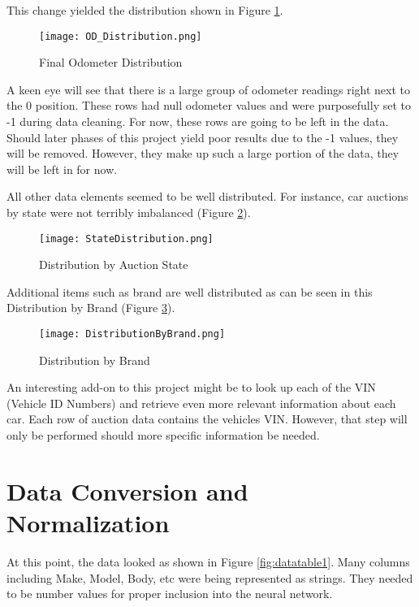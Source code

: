 \documentclass[a4paper,12pt]{article}
\begin{document}
This change yielded the distribution shown in Figure {\ref{fig:ODdist}}.

\begin{figure}
\centerline{\texttt{[image: OD\_Distribution.png]}}
\caption{Final Odometer Distribution}
\label{fig:ODdist}
\end{figure}

A keen eye will see that there is a large group of odometer readings right next to the 0 position.  These rows had null odometer values and were purposefully set to -1 during data cleaning.  For now, these rows are going to be left in the data.  Should later phases of this project yield poor results due to the -1 values, they will be removed.  However, they make up such a large portion of the data, they will be left in for now.

All other data elements seemed to be well distributed.  For instance, car auctions by state were not terribly imbalanced (Figure {\ref{fig:statedist}}).

\begin{figure}
\centerline{\texttt{[image: StateDistribution.png]}}
\caption{Distribution by Auction State}
\label{fig:statedist}
\end{figure}

Additional items such as brand are well distributed as can be seen in this Distribution by Brand (Figure {\ref{fig:branddist}}).

\begin{figure}
\centerline{\texttt{[image: DistributionByBrand.png]}}
\caption{Distribution by Brand}
\label{fig:branddist}
\end{figure}

An interesting add-on to this project might be to look up each of the VIN (Vehicle ID Numbers) and retrieve even more relevant information about each car.  Each row of auction data contains the vehicles VIN.  However, that step will only be performed should more specific information be needed.

\section{Data Conversion and Normalization}\label{data-normalization}

At this point, the data looked as shown in Figure \ref{fig:datatable1}. Many columns including Make, Model, Body, etc were being represented as strings.  They needed to be number values for proper inclusion into the neural network.
\end{document}
